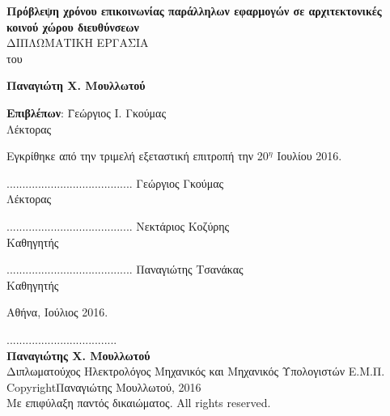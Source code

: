 \documentclass[a4paper,twoside,titlepage,11pt]{book}
\begin{document}
\begin{center}
\vspace{8ex}
\large \textbf{Πρόβλεψη χρόνου επικοινωνίας παράλληλων εφαρμογών σε αρχιτεκτονικές κοινού χώρου διευθύνσεων} \\
\vspace{10ex}
\large
ΔΙΠΛΩΜΑΤΙΚΗ ΕΡΓΑΣΙΑ \\
\vspace{2ex}
\normalsize
του\\
\vspace{2ex}
\parbox[c]{0.8\textwidth} { \center\textbf{
Παναγιώτη Χ. Μουλλωτού }}
\vspace{10ex}
\flushleft
\begin{tabbing}
	\textbf{Επιβλέπων}: \= Γεώργιος Ι. Γκούμας \\
			    \> Λέκτορας
\end{tabbing}
\end{center}

\noindent
Εγκρίθηκε από την τριμελή εξεταστική επιτροπή την 20$^\eta$ Ιουλίου 2016.\\[1cm]

\begin{center}
\scriptsize
\parbox[b]{0.3\textwidth} {\center
	........................................
	Γεώργιος Γκούμας\\
	Λέκτορας
}
\parbox[b]{0.3\textwidth} {\center
	........................................
	Νεκτάριος Κοζύρης\\
	Καθηγητής
}
\parbox[b]{0.3\textwidth} {\center
	........................................
	Παναγιώτης Τσανάκας\\
	Καθηγητής
}
\end{center}
\vspace{10ex}
\normalsize
\noindent
\begin{center}
Αθήνα, Ιούλιος 2016.
\end{center}
\newpage
\hspace{10pt}

\vspace{20ex}
	\noindent
................................... \\
\textbf{Παναγιώτης Χ. Μουλλωτού} \\
Διπλωματούχος Ηλεκτρολόγος Μηχανικός και Μηχανικός Υπολογιστών Ε.Μ.Π. \\

\vspace*{\fill}
\noindent Copyright\textcopyright \quad  Παναγιώτης Μουλλωτού, 2016\\
Με επιφύλαξη παντός δικαιώματος. All rights reserved.
\end{document}
